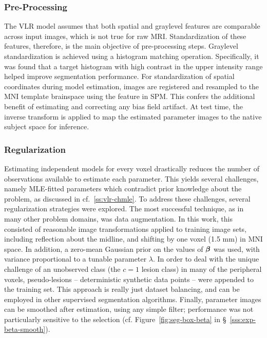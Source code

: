 \subsubsection{Pre-Processing}
The VLR model assumes that both spatial and graylevel features are comparable across input images,
which is not true for raw MRI.
Standardization of these features, therefore, is the main objective of pre-processing steps.
Graylevel standardization is achieved using a histogram matching operation.
Specifically, it was found that a target histogram with high contrast in the upper intensity range
helped improve segmentation performance.
For standardization of spatial coordinates during model estimation,
images are registered and resampled to the MNI template brainspace
using the  feature in SPM.
This confers the additional benefit of estimating and correcting any bias field artifact.
At test time, the inverse transform is applied to map the estimated parameter images
to the native subject space for inference.
\subsubsection{Regularization}
Estimating independent models for every voxel drastically reduces the number of observations
available to estimate each parameter.
This yields several challenges, namely MLE-fitted parameters which
contradict prior knowledge about the problem, as discussed in cf.~\ref{ss:vlr-chmle}.
To address these challenges, several regularization strategies were explored.
The most successful technique, as in many other problem domains, was data augmentation.
In this work, this consisted of reasonable image transformations
applied to training image sets, including
reflection about the midline,
and shifting by one voxel (1.5 mm) in MNI space.
In addition, a zero-mean Gaussian prior on the values of $\bm{\beta}$ was used,
with variance proportional to a tunable parameter $\lambda$.
In order to deal with the unique challenge of an unobserved class (the $c=1$ lesion class)
in many of the peripheral voxels,
pseudo-lesions -- deterministic synthetic data points --
were appended to the training set.
This approach is really just dataset balancing,
and can be employed in other supervised segmentation algorithms.
Finally, parameter images can be smoothed after estimation, using any simple filter;
performance was not particularly sensitive to the selection
(cf. Figure~\ref{fig:seg-box-beta} in \S~\ref{sss:exp-beta-smooth}).

